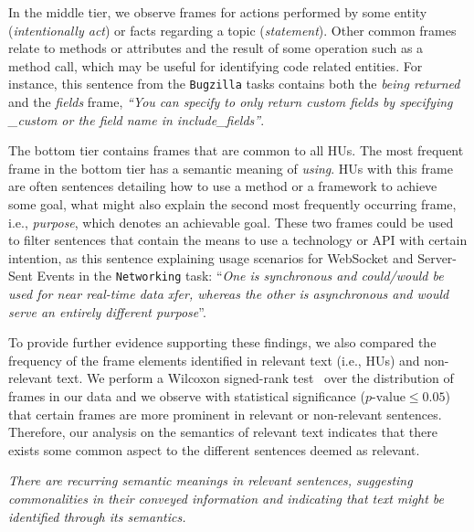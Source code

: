 In the middle tier, we observe frames for actions performed by some entity (\textit{intentionally act}) or facts regarding a topic (\textit{statement}).
Other common frames relate to methods or attributes and the result of some operation such as a method call, which may be useful for identifying code related entities.
For instance, this sentence from the \texttt{Bugzilla} tasks contains both the \textit{being returned} and the \textit{fields} frame, 
\textit{``You can specify to only return custom fields by specifying \_custom or the field name in include\_fields''}.


\afterpage{

}

The bottom tier contains frames that are common to all HUs.
The most frequent frame in the bottom tier has a semantic meaning of \textit{using}.
HUs with this frame are often sentences detailing how to use a method or a
framework to achieve some goal, what might also explain the second most frequently occurring frame, i.e., \textit{purpose}, which denotes an achievable goal. 
These two frames could be used to filter sentences that contain the means
to use a technology or API with certain intention, as this sentence explaining usage scenarios for
WebSocket and Server-Sent Events in the \texttt{Networking} task:
``\textit{One is synchronous and could/would be used for near real-time data xfer, whereas the other is asynchronous and would serve an entirely different purpose}''.




To provide further evidence supporting these findings,
we also  compared the frequency of the frame elements identified in relevant text (i.e., HUs) and non-relevant text.
We perform a Wilcoxon signed-rank test~\cite{wohlin2012} over the distribution of frames in our data and we observe with statistical significance ($p\text{-value} \le 0.05$) 
that certain frames are more prominent in relevant or non-relevant sentences.
Therefore, our analysis on the semantics of relevant text indicates that there exists some common aspect to the different sentences deemed as relevant.






\medskip
\begin{bluequote}
    \textit{There are recurring semantic meanings in relevant sentences,
    suggesting commonalities in their conveyed information
    and indicating that text might be identified through its semantics.}
\end{bluequote}







